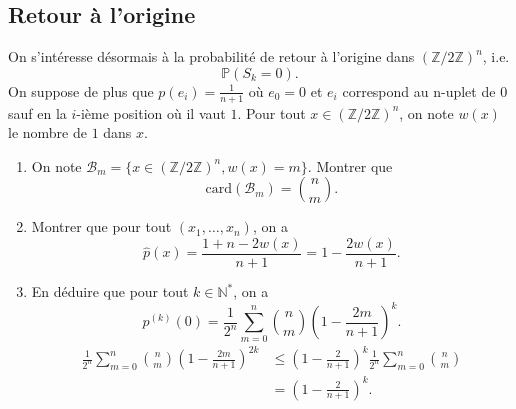 \documentclass{article}[a4paper]
\newcommand{\N}{\mathbb{N}}
\newcommand{\Z}{\mathbb{Z}}
\renewcommand{\P}{\mathbb{P}}
\begin{document}
\begin{enumerate}
    \subsection{Retour à l'origine}
    On s'intéresse désormais à la probabilité de retour à l'origine dans \((\Z/2\Z)^n\), i.e. 
    \begin{equation*}
        \P(S_{k} = 0).
    \end{equation*}
    On suppose de plus que \(p(e_i) = \frac{1}{n+1}\) où \(e_0 = 0\) et \(e_i\) correspond 
    au n-uplet de \(0\) sauf en la \(i\)-ième position où il vaut \(1\). Pour tout \(x\in (\Z/2\Z)^n\), on note
    \(w(x)\) le nombre de \(1\) dans \(x\).
    \begin{enumerate}
        \item On note \(\mathcal{B}_m = \{x\in (\Z/2\Z)^n,w(x)= m\}\). Montrer que 
        \begin{equation*}
            \mathrm{card}(\mathcal{B}_m) = \binom{n}{m}.
        \end{equation*}
        \item Montrer que pour tout \((x_1,\dots,x_n)\), on a 
        \begin{equation*}
            \hat{p}(x) = \frac{1+n-2w(x)}{n+1} = 1 - \frac{2w(x)}{n+1}.
        \end{equation*}
        \item En déduire que pour tout \(k\in \N^*\), on a
        \begin{equation*}
            p^{(k)}(0) = \frac{1}{2^n}\sum_{m=0}^n \binom{n}{m} \left(1 - \frac{2m}{n+1}\right)^k.
        \end{equation*}
        \begin{align*}
            \frac{1}{2^n}\sum_{m=0}^n \binom{n}{m} \left(1 - \frac{2m}{n+1}\right)^{2k} 
            &\le \left(1-\frac{2}{n+1}\right)^k\frac{1}{2^n}\sum_{m=0}^n \binom{n}{m}\\
            & = \left(1-\frac{2}{n+1}\right)^k.
        \end{align*}
    \end{enumerate}
\end{enumerate}
\end{document}
